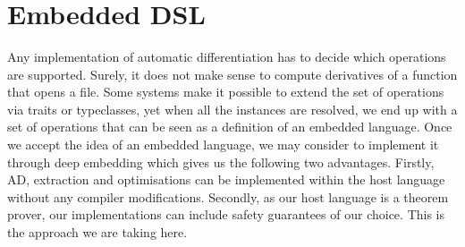\begin{code}[hide]%
\>[0]\AgdaSymbol{\{-\#}\AgdaSpace{}%
%
\>[13]\AgdaSpace{}%
\AgdaSymbol{\#-\}}\<%
\\
\>[0]\AgdaSpace{}%
\AgdaSpace{}%
\<%
\\
\>[0]\AgdaSpace{}%
\AgdaSpace{}%
\<%
\\
\>[0]\AgdaSpace{}%
\AgdaSpace{}%
\AgdaSpace{}%
\AgdaSpace{}%
\AgdaSymbol{(}\AgdaSymbol{;}\AgdaSpace{}%
\AgdaInductiveConstructor{[]}\AgdaSymbol{;}\AgdaSpace{}%
\AgdaSymbol{)}\<%
\\
\>[0]\AgdaSpace{}%
\AgdaSpace{}%
\AgdaSpace{}%
\AgdaSpace{}%
\AgdaSymbol{(}\AgdaSymbol{;}\AgdaSpace{}%
\AgdaSymbol{;}\AgdaSpace{}%
\AgdaSymbol{)}\<%
\\
\>[0]\AgdaSpace{}%
\AgdaSpace{}%
\<%
\\
\>[0]\<%
\\
%
\\[\AgdaEmptyExtraSkip]%
\>[0]\<%
\\
\>[0]\AgdaSpace{}%
\AgdaSpace{}%
\<%
\\
\>[0]\AgdaSpace{}%
\AgdaModule{\AgdaUnderscore{}}\AgdaSpace{}%
\<%
\end{code}
\section{Embedded DSL \label{sec:edsl}}

Any implementation of automatic differentiation has to decide which operations
are supported.  Surely, it does not make sense to compute derivatives
of a function that opens a file.  Some systems make it possible to extend
the set of operations via traits or typeclasses, yet when all the instances
are resolved, we end up with a set of operations that
can be seen as a definition of an embedded language.
Once we accept the idea of an embedded language, we may consider to implement
it through deep embedding which gives us the following two advantages.
Firstly, AD, extraction and optimisations can be implemented within the
host language without any compiler modifications.  Secondly, as our host
language is a theorem prover, our implementations can include safety
guarantees of our choice.  This is the approach we are taking here.

